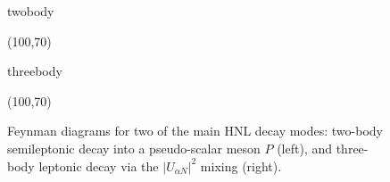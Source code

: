 \begin{figure}
	\centering
	\begin{fmffile}{twobody}
		\begin{fmfgraph*}(100,70)
		\end{fmfgraph*}
	\end{fmffile}
	\qquad\qquad
	\begin{fmffile}{threebody}
		\begin{fmfgraph*}(100,70)
		\end{fmfgraph*}
	\end{fmffile}

	\caption[Feynman diagrams for HNL decay two-body and three-body decays.]
	{Feynman diagrams for two of the main HNL decay modes: two-body semileptonic decay into a pseudo-scalar meson $P$ (left), %
		and three-body leptonic decay via the $|U_{\alpha N}|^2$ mixing (right).
	}
	\label{fig:HNL_fyenman}
\end{figure}


